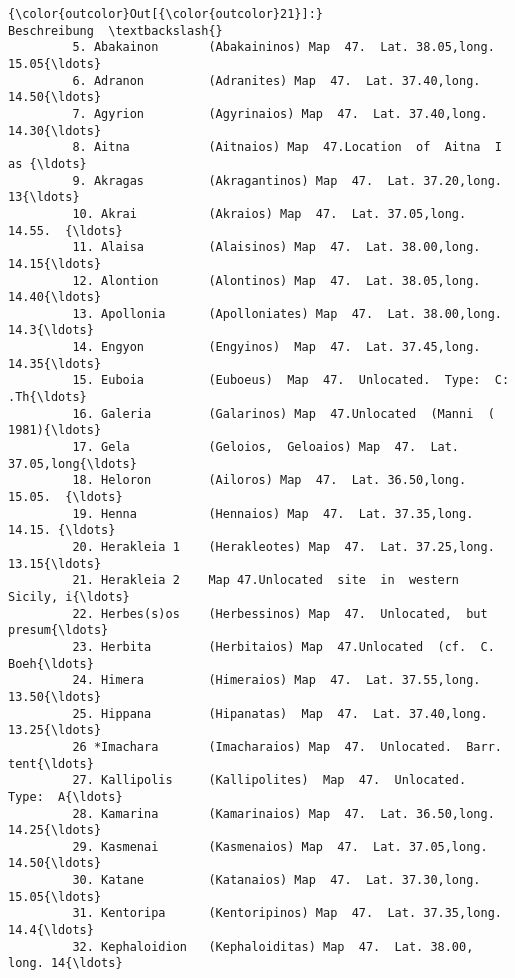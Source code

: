 \documentclass[11pt]{article}
\begin{document}
            \begin{Verbatim}[commandchars=\\\{\}]
{\color{outcolor}Out[{\color{outcolor}21}]:}                                                         Beschreibung  \textbackslash{}
         5. Abakainon       (Abakaininos) Map  47.  Lat. 38.05,long. 15.05{\ldots}   
         6. Adranon         (Adranites) Map  47.  Lat. 37.40,long.  14.50{\ldots}   
         7. Agyrion         (Agyrinaios) Map  47.  Lat. 37.40,long.  14.30{\ldots}   
         8. Aitna           (Aitnaios) Map  47.Location  of  Aitna  I  as {\ldots}   
         9. Akragas         (Akragantinos) Map  47.  Lat. 37.20,long.  13{\ldots}   
         10. Akrai          (Akraios) Map  47.  Lat. 37.05,long.  14.55.  {\ldots}   
         11. Alaisa         (Alaisinos) Map  47.  Lat. 38.00,long.  14.15{\ldots}   
         12. Alontion       (Alontinos) Map  47.  Lat. 38.05,long.  14.40{\ldots}   
         13. Apollonia      (Apolloniates) Map  47.  Lat. 38.00,long. 14.3{\ldots}   
         14. Engyon         (Engyinos)  Map  47.  Lat. 37.45,long.  14.35{\ldots}   
         15. Euboia         (Euboeus)  Map  47.  Unlocated.  Type:  C: .Th{\ldots}   
         16. Galeria        (Galarinos) Map  47.Unlocated  (Manni  ( 1981){\ldots}   
         17. Gela           (Geloios,  Geloaios) Map  47.  Lat. 37.05,long{\ldots}   
         18. Heloron        (Ailoros) Map  47.  Lat. 36.50,long.  15.05.  {\ldots}   
         19. Henna          (Hennaios) Map  47.  Lat. 37.35,long.  14.15. {\ldots}   
         20. Herakleia 1    (Herakleotes) Map  47.  Lat. 37.25,long. 13.15{\ldots}   
         21. Herakleia 2    Map 47.Unlocated  site  in  western  Sicily, i{\ldots}   
         22. Herbes(s)os    (Herbessinos) Map  47.  Unlocated,  but presum{\ldots}   
         23. Herbita        (Herbitaios) Map  47.Unlocated  (cf.  C.  Boeh{\ldots}   
         24. Himera         (Himeraios) Map  47.  Lat. 37.55,long.  13.50{\ldots}   
         25. Hippana        (Hipanatas)  Map  47.  Lat. 37.40,long.  13.25{\ldots}   
         26 *Imachara       (Imacharaios) Map  47.  Unlocated.  Barr. tent{\ldots}   
         27. Kallipolis     (Kallipolites)  Map  47.  Unlocated.  Type:  A{\ldots}   
         28. Kamarina       (Kamarinaios) Map  47.  Lat. 36.50,long. 14.25{\ldots}   
         29. Kasmenai       (Kasmenaios) Map  47.  Lat. 37.05,long. 14.50{\ldots}   
         30. Katane         (Katanaios) Map  47.  Lat. 37.30,long.  15.05{\ldots}   
         31. Kentoripa      (Kentoripinos) Map  47.  Lat. 37.35,long. 14.4{\ldots}   
         32. Kephaloidion   (Kephaloiditas) Map  47.  Lat. 38.00, long. 14{\ldots}   

\end{Verbatim}
\end{document}
